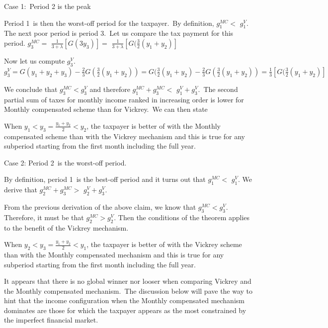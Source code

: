 Case 1:\ Period 2 is the peak

Period 1\ is then the worst-off period for the taxpayer.\ By definition,
$g_{1}^{MC}<$ $g_{1}^{V}.$ The next poor period is period 3.\ Let us compare
the tax payment for this period. $g_{3}^{MC}=$ $\frac{1}{3+\lambda}%
[G(3y_{3})]=$ $\frac{1}{3+\lambda}[G(\frac{3}{2}(y_{1}+y_{2})]$

Now let us compute $g_{3}^{V}.$ $g_{3}^{V}=G(y_{1}+y_{2}+y_{3})-\frac{2}%
{3}G(\frac{3}{2}(y_{1}+y_{2}))=G(\frac{3}{2}(y_{1}+y_{2})-\frac{2}{3}%
G(\frac{3}{2}(y_{1}+y_{2}))=\frac{1}{3}[G(\frac{3}{2}(y_{1}+y_{2})]$

We conclude that $g_{3}^{MC}<g_{3}^{V}$ and therefore $g_{1}^{MC}+g_{3}^{MC}<
$ $g_{1}^{V}+g_{3}^{V}.$\ The second partial sum of taxes for monthly income
ranked in increasing order is lower for Monthly compensated scheme than for
Vickrey.\ We can then state

\begin{claim}
When $y_{1}<y_{3}=\frac{y_{1}+y_{2}}{2}<y_{2}$, the taxpayer is better of with
the Monthly compensated scheme than with the Vickrey mechanism and this is
true for any subperiod starting from the first month including the full year.
\end{claim}

Case 2: Period 2\ is the worst-off period.

By definition, period 1\ is the best-off period and it turns out that
$g_{1}^{MC}<$ $g_{1}^{V}.$ We derive that $g_{2}^{MC}+g_{3}^{MC}>$ $g_{2}%
^{V}+g_{3}^{V}.$

From the previous derivation of the above claim, we know that $g_{3}%
^{MC}<g_{3}^{V}.$ Therefore, it must be that $g_{2}^{MC}>g_{2}^{V}$. Then the
conditions of the theorem applies to the benefit of the Vickrey mechanism.\ 

\begin{claim}
When $y_{2}<y_{3}=\frac{y_{1}+y_{2}}{2}<y_{1}$, the taxpayer is better of with
the Vickrey scheme than with the Monthly compensated mechanism and this is
true for any subperiod starting from the first month including the full year.
\end{claim}

It appears that there is no global winner nor looser when comparing Vickrey
and the Monthly compensated mechanism.\ The discussion below will pave the way
to hint that the income configuration when the Monthly compensated mechanism
dominates are those for which the taxpayer appears as the most constrained by
the imperfect financial market.\ 

